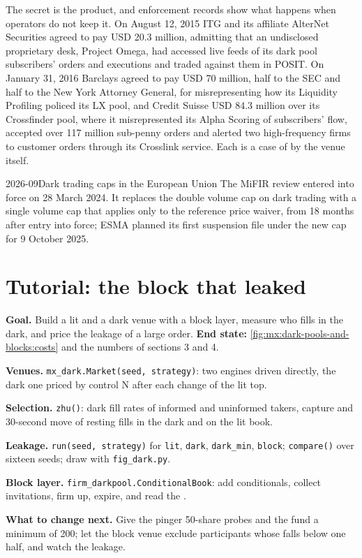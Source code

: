 The secret is the product, and enforcement records show what happens when operators do not keep it. On August 12, 2015 ITG and its affiliate AlterNet
Securities agreed to pay USD 20.3 million, admitting that an undisclosed proprietary desk, Project Omega, had accessed live feeds of its dark pool
subscribers' orders and executions and traded against them in POSIT. On January 31, 2016 Barclays agreed to pay USD 70 million, half to the SEC and half to
the New York Attorney General, for misrepresenting how its Liquidity Profiling policed its LX pool, and Credit Suisse USD 84.3 million over its
Crossfinder pool, where it misrepresented its Alpha Scoring of subscribers' flow, accepted over 117 million sub-penny orders and alerted two
high-frequency firms to customer orders through its Crosslink service. Each is a case of  by the venue itself.

\begin{dated}{2026-09}{Dark trading caps in the European Union}\label{dat:mx:dark-pools-and-blocks:svc}
The MiFIR review entered into force on 28 March 2024. It replaces the double volume cap on dark trading with a single volume cap that applies only to the
reference price waiver, from 18 months after entry into force; ESMA planned its first suspension file under the new cap for 9 October 2025.
\end{dated}

\section{Tutorial: the block that leaked}\label{tut:mx:dark-pools-and-blocks:tut}

\begin{tutorial}
\textbf{Goal.} Build a lit and a dark venue with a block layer, measure who fills in the dark, and price the leakage of a large order.
\textbf{End state:} \cref{fig:mx:dark-pools-and-blocks:costs} and the numbers of sections 3 and 4.
\begin{tutsteps}
\item \textbf{Venues.} \texttt{mx\_dark.Market(seed, strategy)}: two engines driven directly, the dark one priced by control N after each change of the
lit top.
\item \textbf{Selection.} \texttt{zhu()}: dark fill rates of informed and uninformed takers, capture and 30-second move of resting fills in the dark and on
the lit book.
\item \textbf{Leakage.} \texttt{run(seed, strategy)} for \texttt{lit}, \texttt{dark}, \texttt{dark\_min}, \texttt{block}; \texttt{compare()} over
sixteen seeds; draw with \texttt{fig\_dark.py}.
\item \textbf{Block layer.} \texttt{firm\_darkpool.ConditionalBook}: add conditionals, collect invitations, firm up, expire, and read the .
\end{tutsteps}
\textbf{What to change next.} Give the pinger 50-share probes and the fund a minimum of 200; let the block venue exclude participants whose 
falls below one half, and watch the leakage.
\end{tutorial}

